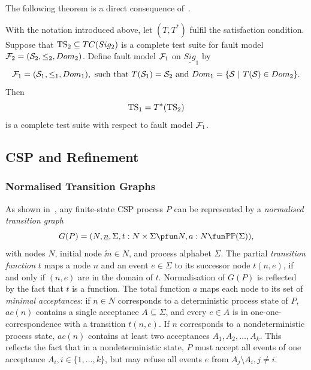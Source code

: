  


 The following theorem is a direct consequence of~\cite[Theorem~2.1]{Huang2017}.

\begin{theorem}\label{th:theorytranslation}
With the notation introduced above, let  $(T,T^*)$ fulfil the satisfaction condition.
Suppose that ${\text{TS}}_2 \subseteq TC(Sig_2)$ is a complete test suite
for fault model ${\cal F}_2 = ({\cal S}_2,\le_2,Dom_2)$. Define fault model ${\cal F}_1$ on 
$\underline{Sig}_1$ by
$$
{\cal F}_1 = ({\cal S}_1,\le_1,Dom_1),\ \text{such that}\
T({\cal S}_1)  =  {\cal S}_2\ \text{and}\
Dom_1  =  \{ {\cal S}~|~T({\cal S})\in Dom_2 \}.
$$
Then
$$
{\text{TS}}_1 = T^*({\text{TS}}_2)
$$
is a complete test suite with respect to fault model ${\cal F}_1$.
\xbox
\end{theorem}

 
 


\subsection{CSP and Refinement}

\subsubsection*{Normalised Transition Graphs}

As shown in~\cite{Roscoe:1994:CME:197600}, any finite-state CSP process $P$ can be represented by a \emph{normalised transition graph} 
$$
G(P) = ( N, \ii n, \Sigma, t : N\times\Sigma \pfun N, a : N \fun \mathbb{P}\mathbb{P}(\Sigma)),
$$
with nodes $N$, initial node $\ii n\in N$, and process alphabet $\Sigma$. The partial \emph{transition function} $t$ maps a node $n$ and an event $e\in\Sigma$ to its successor node $t(n,e)$, if and only if $(n,e)$ are in the domain of $t$. Normalisation of $G(P)$ is reflected 
by the fact that $t$ is a function. The total function $a$ maps each node to its set of \emph{minimal acceptances}: 
if $n\in N$ corresponds to a deterministic process state of $P$, $ac(n)$ contains a single acceptance $A\subseteq \Sigma$, and every $e\in A$ is in one-one-correspondence with a transition $t(n,e)$. If $n$ corresponds to a nondeterministic process state, $ac(n)$ contains at least two acceptances $A_1, A_2, \dots, A_k$. This reflects the fact that in a nondeterministic state, $P$ must accept all events of one acceptance 
$A_i, i \in \{ 1,\dots,k\}$, but may refuse all events $e$ from 
$A_j \setminus A_i, j\neq i$. 

